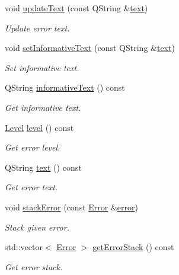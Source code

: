 \begin{DoxyCompactItemize}
void \hyperlink{class_mdt_1_1_error_a85d4e982ed7972b8d43f78129d6c51e6}{update\+Text} (const Q\+String \&\hyperlink{class_mdt_1_1_error_a99327678615e8f2bddd22cd59482bfc2}{text})
\begin{DoxyCompactList}\small\item\em Update error text. \end{DoxyCompactList}\item 
void \hyperlink{class_mdt_1_1_error_a12c8b4de8011d03fa7d45d8e653713ae}{set\+Informative\+Text} (const Q\+String \&\hyperlink{class_mdt_1_1_error_a99327678615e8f2bddd22cd59482bfc2}{text})
\begin{DoxyCompactList}\small\item\em Set informative text. \end{DoxyCompactList}\item 
Q\+String \hyperlink{class_mdt_1_1_error_a12fcf366a6bf68b8daaea4b43526e033}{informative\+Text} () const 
\begin{DoxyCompactList}\small\item\em Get informative text. \end{DoxyCompactList}\item 
\hyperlink{class_mdt_1_1_error_ab533dc690f68a8635232db594194a068}{Level} \hyperlink{class_mdt_1_1_error_a9c73117a49791ab87163b815d6a3e0c9}{level} () const 
\begin{DoxyCompactList}\small\item\em Get error level. \end{DoxyCompactList}\item 
Q\+String \hyperlink{class_mdt_1_1_error_a99327678615e8f2bddd22cd59482bfc2}{text} () const 
\begin{DoxyCompactList}\small\item\em Get error text. \end{DoxyCompactList}\item 
void \hyperlink{class_mdt_1_1_error_a4133276f217c5a6dac890a18059607cd}{stack\+Error} (const \hyperlink{class_mdt_1_1_error}{Error} \&\hyperlink{class_mdt_1_1_error_a0d042250a76d0351b8c19367572f5e11}{error})
\begin{DoxyCompactList}\small\item\em Stack given error. \end{DoxyCompactList}\item 
std\+::vector$<$ \hyperlink{class_mdt_1_1_error}{Error} $>$ \hyperlink{class_mdt_1_1_error_a6acc6143b706449ba1ff083286d5ccf6}{get\+Error\+Stack} () const 
\begin{DoxyCompactList}\small\item\em Get error stack. \end{DoxyCompactList}\item 

\end{DoxyCompactItemize}
